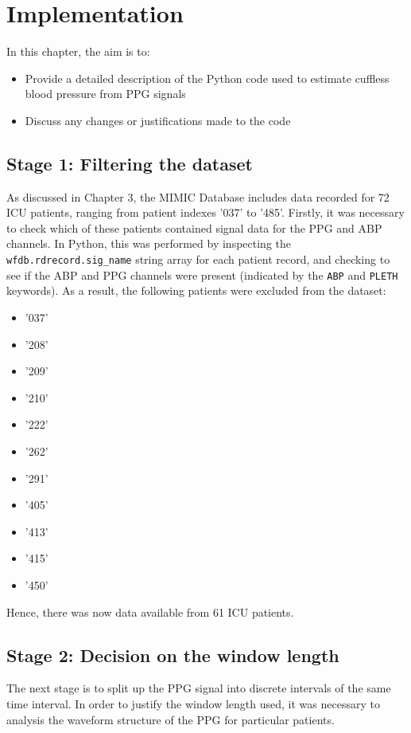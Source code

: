 \section{Implementation}
In this chapter, the aim is to:

\begin{itemize}
    \item Provide a detailed description of the Python code used to estimate cuffless blood pressure from PPG signals
    \item Discuss any changes or justifications made to the code
\end{itemize}

\subsection{Stage 1: Filtering the dataset}
As discussed in Chapter 3, the MIMIC Database includes data
recorded for 72 ICU patients, ranging from patient indexes '037' to '485'. Firstly, it was necessary to check which 
of these patients contained signal data for the PPG and ABP channels. In Python, this was performed by inspecting the 
\texttt{wfdb.rdrecord.sig\_name} string array for each patient record, and checking to see if the ABP and PPG channels were present (indicated by the 
\texttt{ABP} and \texttt{PLETH} keywords). As a result, the following patients were excluded from the dataset:

\begin{itemize}
    \item '037'
    \item '208'
    \item '209'
    \item '210'
    \item '222'
    \item '262'
    \item '291'
    \item '405'
    \item '413'
    \item '415'
    \item '450'
\end{itemize}\noindent Hence, there was now data available from 61 ICU patients.

\subsection{Stage 2: Decision on the window length}
The next stage is to split up the PPG signal into discrete intervals of the same time interval. In order to justify the window length used, 
it was necessary to analysis the waveform structure of the PPG for particular patients. 

